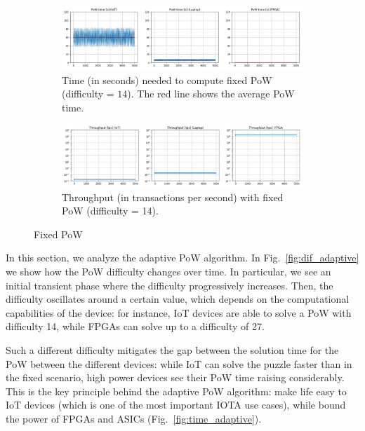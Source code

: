 \documentclass[../main.tex]{subfiles}
\begin{document}
\begin{figure}
    \centering
    \begin{subfigure}[b]{\textwidth}
        \includegraphics[width=\linewidth]{images/time_fixed.PNG}
        \caption{Time (in seconds) needed to compute fixed PoW (difficulty = $14$). The red line shows the average PoW time.}
        \label{fig:time_fixed}
    \end{subfigure}
    
    \begin{subfigure}[b]{\textwidth}
        \includegraphics[width=\linewidth]{images/tps_fixed.PNG}
        \caption{Throughput (in transactions per second) with fixed PoW (difficulty = 14).}
        \label{fig:tps_fixed}
    \end{subfigure}
    \caption{Fixed PoW}\label{fig:fixed}
\end{figure}

In this section, we analyze the adaptive PoW algorithm. In Fig.~\ref{fig:dif_adaptive} we show how the PoW difficulty changes over time. In particular, we see an initial transient phase where the difficulty progressively increases. Then, the difficulty oscillates around a certain value, which depends on the computational capabilities of the device: for instance, IoT devices are able to solve a PoW with difficulty 14, while FPGAs can solve up to a difficulty of 27.

Such a different difficulty mitigates the gap between the solution time for the PoW between the different devices: while IoT can solve the puzzle faster than in the fixed scenario, high power devices see their PoW time raising considerably. This is the key principle behind the adaptive PoW algorithm: make life easy to IoT devices (which is one of the most important IOTA use cases), while bound the power of FPGAs and ASICs (Fig.~\ref{fig:time_adaptive}).
\end{document}
